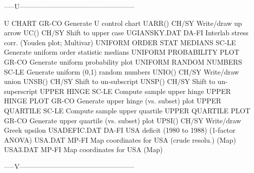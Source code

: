 -----U--------------------------------------------------

U CHART                     GR-CO Generate U control chart
UARR()                      CH/SY Write/draw up arrow
UC()                        CH/SY Shift to upper case
UGIANSKY.DAT                DA-FI Interlab stress corr. (Youden plot; Multivar)
UNIFORM ORDER STAT MEDIANS  SC-LE Generate uniform order statistic medians
UNIFORM PROBABILITY PLOT    GR-CO Generate uniform probability plot
UNIFORM RANDOM NUMBERS      SC-LE Generate uniform (0,1) random numbers
UNIO()                      CH/SY Write/draw union
UNSB()                      CH/SY Shift to un-subscript
UNSP()                      CH/SY Shift to un-superscript
UPPER HINGE                 SC-LE Compute sample upper hinge
UPPER HINGE PLOT            GR-CO Generate upper hinge (vs. subset) plot
UPPER QUARTILE              SC-LE Compute sample upper quartile
UPPER QUARTILE PLOT         GR-CO Generate upper quartile (vs. subset) plot
UPSI()                      CH/SY Write/draw Greek upsilon
USADEFIC.DAT                DA-FI USA deficit (1980 to 1988) (1-factor ANOVA)
USA.DAT                     MP-FI Map coordinates for USA (crude resolu.) (Map)
USA3.DAT                    MP-FI Map coordinates for USA (Map)

-----V--------------------------------------------------

